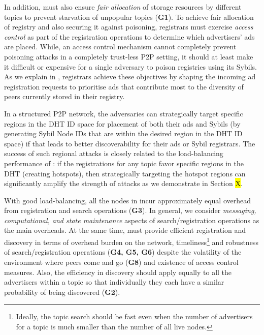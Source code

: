 In addition, \sysname must also ensure \textit{fair allocation} of storage resources by different topics to prevent starvation of unpopular topics (\textbf{G1}). To achieve fair allocation of registry and also securing it against poisoning, registrars must exercise \textit{access control} as part of the registration operations to determine which advertisers' ads are placed. While, an access control mechanism cannot completely prevent poisoning attacks in a completely trust-less P2P setting, it should at least make it difficult or expensive for a single adversary to poison registries using its Sybils. As we explain in , registrars achieve these objectives by shaping the incoming ad registration requests to prioritise ads that contribute most to the diversity of peers currently stored in their registry.


In a structured P2P network, the adversaries can strategically target specific regions in the DHT ID space for placement of both their ads and Sybils (\ie by generating Sybil Node IDs that are within the desired region in the DHT ID space) if that leads to better discoverability for their ads or Sybil registrars. The success of such regional attacks is closely related to the load-balancing performance of \sysname: if the registrations for any topic favor specific regions in the DHT (\ie creating hotspots), then strategically targeting the hotspot regions can significantly amplify the strength of attacks as we demonstrate in Section \hl{X}. 

 With good load-balancing, all the nodes in \sysname incur approximately equal overhead from registration and search operations (\textbf{G3}). In general, we consider \textit{messaging, computational, and state maintenance} aspects of search/registration operations as the main overheads. At the same time, \sysname must provide efficient registration and discovery in terms of overhead burden on the network, timeliness\footnote{Ideally, the topic search should be fast even when the number of advertisers for a topic is much smaller than the number of all live nodes.} and robustness of search/registration operations (\textbf{G4, G5, G6}) despite the volatility of the environment where peers come and go (\textbf{G8}) and existence of access control measures. Also, the efficiency in discovery should apply equally to all the advertisers within a topic so that individually they each have a similar probability of being discovered (\textbf{G2}). 

